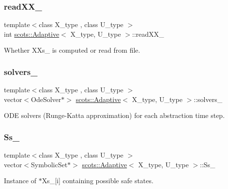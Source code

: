 \subsubsection{\texorpdfstring{read\+X\+X\+\_\+}{readXX\_}}
{\footnotesize\ttfamily template$<$class X\+\_\+type , class U\+\_\+type $>$ \\
int \hyperlink{classscots_1_1Adaptive}{scots\+::\+Adaptive}$<$ X\+\_\+type, U\+\_\+type $>$\+::read\+X\+X\+\_\+}

Whether X\+Xs\+\_\+ is computed or read from file. \mbox{\label{classscots_1_1Adaptive_a0b300511b5f746c7b24ead30dc0ca9ac}} 
\subsubsection{\texorpdfstring{solvers\+\_\+}{solvers\_}}
{\footnotesize\ttfamily template$<$class X\+\_\+type , class U\+\_\+type $>$ \\
vector$<$Ode\+Solver$\ast$$>$ \hyperlink{classscots_1_1Adaptive}{scots\+::\+Adaptive}$<$ X\+\_\+type, U\+\_\+type $>$\+::solvers\+\_\+}

O\+DE solvers (Runge-\/\+Katta approximation) for each abstraction time step. \mbox{\label{classscots_1_1Adaptive_a4afb0056b1ab5f1f73b1740806267044}} 
\subsubsection{\texorpdfstring{Ss\+\_\+}{Ss\_}}
{\footnotesize\ttfamily template$<$class X\+\_\+type , class U\+\_\+type $>$ \\
vector$<$Symbolic\+Set$\ast$$>$ \hyperlink{classscots_1_1Adaptive}{scots\+::\+Adaptive}$<$ X\+\_\+type, U\+\_\+type $>$\+::Ss\+\_\+}

Instance of $\ast$\+Xs\+\_\+\mbox{[}i\mbox{]} containing possible safe states. \mbox{\label{classscots_1_1Adaptive_a8b47913f64f175d3b2b1bebdfcb4ec39}} 
